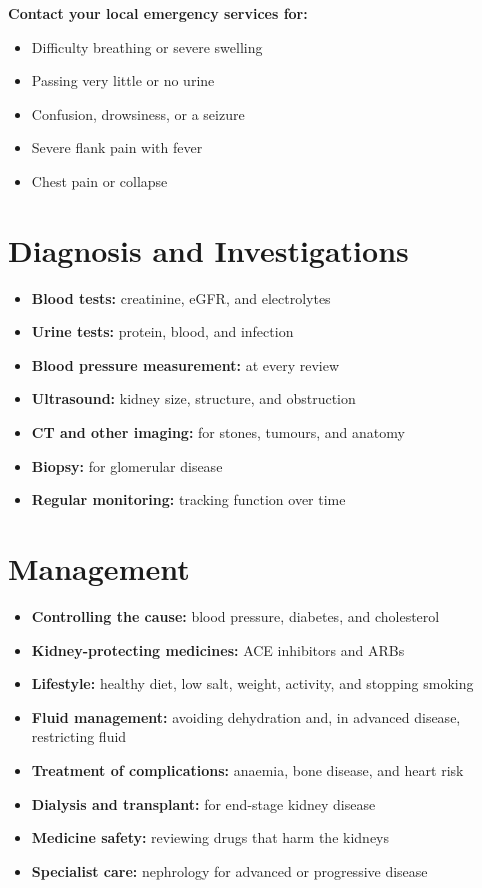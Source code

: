 \textbf{Contact your local emergency services for:}
\begin{itemize}
    \item Difficulty breathing or severe swelling
    \item Passing very little or no urine
    \item Confusion, drowsiness, or a seizure
    \item Severe flank pain with fever
    \item Chest pain or collapse
\end{itemize}

\section*{Diagnosis and Investigations}
\begin{itemize}
    \item \textbf{Blood tests:} creatinine, eGFR, and electrolytes
    \item \textbf{Urine tests:} protein, blood, and infection
    \item \textbf{Blood pressure measurement:} at every review
    \item \textbf{Ultrasound:} kidney size, structure, and obstruction
    \item \textbf{CT and other imaging:} for stones, tumours, and anatomy
    \item \textbf{Biopsy:} for glomerular disease
    \item \textbf{Regular monitoring:} tracking function over time
\end{itemize}

\section*{Management}
\begin{itemize}
    \item \textbf{Controlling the cause:} blood pressure, diabetes, and cholesterol
    \item \textbf{Kidney-protecting medicines:} ACE inhibitors and ARBs
    \item \textbf{Lifestyle:} healthy diet, low salt, weight, activity, and stopping smoking
    \item \textbf{Fluid management:} avoiding dehydration and, in advanced disease, restricting fluid
    \item \textbf{Treatment of complications:} anaemia, bone disease, and heart risk
    \item \textbf{Dialysis and transplant:} for end-stage kidney disease
    \item \textbf{Medicine safety:} reviewing drugs that harm the kidneys
    \item \textbf{Specialist care:} nephrology for advanced or progressive disease
\end{itemize}


